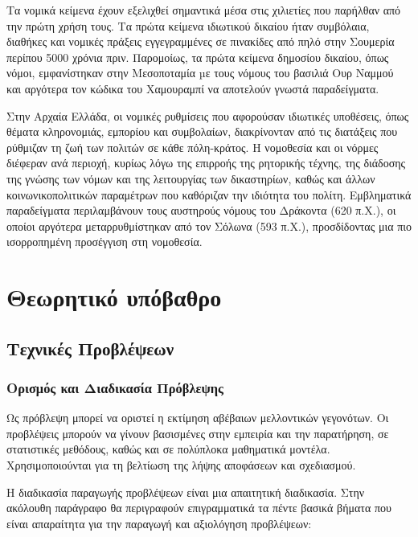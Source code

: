 \documentclass[diploma]{softlab-thesis}
\begin{document}
Τα νομικά κείμενα έχουν εξελιχθεί σημαντικά μέσα στις χιλιετίες που παρήλθαν από την πρώτη χρήση τους. Τα πρώτα κείμενα ιδιωτικού δικαίου ήταν συμβόλαια, διαθήκες και νομικές πράξεις εγγεγραμμένες σε πινακίδες από πηλό στην Σουμερία περίπου 5000 χρόνια πριν. Παρομοίως, τα πρώτα κείμενα δημοσίου δικαίου, όπως νόμοι, εμφανίστηκαν στην Μεσοποταμία µε τους νόμους του βασιλιά Ουρ Ναμμού και αργότερα τον κώδικα του Χαμουραμπί να αποτελούν γνωστά παραδείγματα. 

Στην Αρχαία Ελλάδα, οι νομικές ρυθμίσεις που αφορούσαν ιδιωτικές υποθέσεις, όπως θέματα
κληρονομιάς, εμπορίου και συμβολαίων, διακρίνονταν από τις διατάξεις που ρύθμιζαν τη ζωή των πολιτών σε κάθε πόλη-κράτος. Η νομοθεσία και οι νόρμες διέφεραν ανά περιοχή, κυρίως λόγω της επιρροής της ρητορικής τέχνης, της διάδοσης της γνώσης των νόμων και της λειτουργίας των δικαστηρίων, καθώς και άλλων κοινωνικοπολιτικών παραμέτρων που καθόριζαν την ιδιότητα του πολίτη. Εμβληματικά παραδείγματα περιλαμβάνουν τους αυστηρούς νόμους του Δράκοντα (620 π.Χ.), οι οποίοι αργότερα μεταρρυθμίστηκαν από τον Σόλωνα (593 π.Χ.), προσδίδοντας μια πιο ισορροπημένη προσέγγιση στη νομοθεσία.



\chapter{Θεωρητικό υπόβαθρο}

\section{Τεχνικές Προβλέψεων}

\subsection{Ορισμός και Διαδικασία Πρόβλεψης}

Ως πρόβλεψη μπορεί να οριστεί η εκτίμηση αβέβαιων μελλοντικών γεγονότων. Οι προβλέψεις μπορούν να γίνουν βασισμένες στην εμπειρία και την παρατήρηση, σε στατιστικές μεθόδους, καθώς και σε πολύπλοκα μαθηματικά μοντέλα. Χρησιμοποιούνται για τη βελτίωση της λήψης αποφάσεων και σχεδιασμού. 

Η διαδικασία παραγωγής προβλέψεων είναι μια απαιτητική διαδικασία. Στην ακόλουθη παράγραφο θα περιγραφούν επιγραμματικά τα πέντε βασικά βήματα που είναι απαραίτητα για την παραγωγή και αξιολόγηση προβλέψεων:
\end{document}
